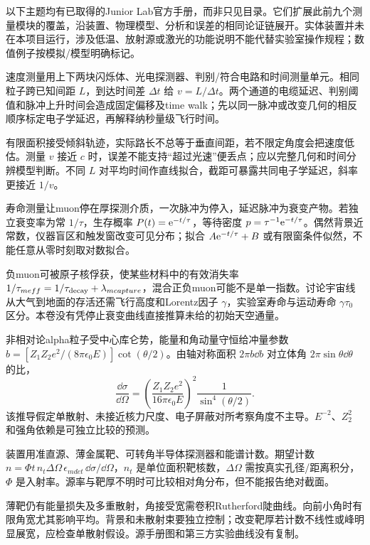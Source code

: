以下主题均有已取得的Junior Lab官方手册，而非只见目录。它们扩展此前九个测量模块的覆盖，沿装置、物理模型、分析和误差的相同论证链展开。实体装置并未在本项目运行，涉及低温、放射源或激光的功能说明不能代替实验室操作规程；数值例子按模拟/模型明确标记。

速度测量用上下两块闪烁体、光电探测器、判别/符合电路和时间测量单元。相同粒子跨已知间距 $L$，到达时间差 $\Delta t$ 给 $v=L/\Delta t$。两个通道的电缆延迟、判别阈值和脉冲上升时间会造成固定偏移及time walk；先以同一脉冲或改变几何的相反顺序标定电子学延迟，再解释纳秒量级飞行时间。

有限面积接受倾斜轨迹，实际路长不总等于垂直间距，若不限定角度会把速度低估。测量 $v$ 接近 $c$ 时，误差不能支持“超过光速”便丢点；应以完整几何和时间分辨模型判断。不同 $L$ 对平均时间作直线拟合，截距可暴露共同电子学延迟，斜率更接近 $1/v$。

寿命测量让muon停在厚探测介质，一次脉冲为停入，延迟脉冲为衰变产物。若独立衰变率为常 $1/\tau$，生存概率 $P(t)=\mathrm e^{-t/\tau}$，等待密度 $p=\tau^{-1}\mathrm e^{-t/\tau}$。偶然背景近常数，仪器盲区和触发窗改变可见分布；拟合 $A\mathrm e^{-t/\tau}+B$ 或有限窗条件似然，不能任意从零时刻取对数拟合。

负muon可被原子核俘获，使某些材料中的有效消失率 $1/\tau_{
m eff}=1/\tau_{\rm decay}+\lambda_{
m capture}$，混合正负muon可能不是单一指数。讨论宇宙线从大气到地面的存活还需飞行高度和Lorentz因子 $\gamma$，实验室寿命与运动寿命 $\gamma\tau_0$ 区分。本卷没有凭停止衰变曲线直接推算未给的初始天空通量。

非相对论alpha粒子受中心库仑势，能量和角动量守恒给冲量参数 $b=[Z_1Z_2e^2/(8\pi\epsilon_0E)]\cot(\theta/2)$。由轴对称面积 $2\pi b\dd b$ 对立体角 $2\pi\sin\theta\dd\theta$ 的比，
\[
\frac{\dd\sigma}{\dd\Omega}=\left(\frac{Z_1Z_2e^2}{16\pi\epsilon_0E}\right)^2\frac1{\sin^4(\theta/2)}.
\]
该推导假定单散射、未接近核力尺度、电子屏蔽对所考察角度不主导。$E^{-2}$、$Z_2^2$ 和强角依赖是可独立比较的预测。

装置用准直源、薄金属靶、可转角半导体探测器和能谱计数。期望计数 $n=\Phi t\,n_t\Delta\Omega\,\epsilon_{
m det}\,\dd\sigma/\dd\Omega$，$n_t$ 是单位面积靶核数，$\Delta\Omega$ 需按真实孔径/距离积分，$\Phi$ 是入射率。源率与靶厚不明时可比较相对角分布，但不能报告绝对截面。

薄靶仍有能量损失及多重散射，角接受宽需卷积Rutherford陡曲线。向前小角时有限角宽尤其影响平均。背景和未散射束要独立控制；改变靶厚若计数不线性或峰明显展宽，应检查单散射假设。源手册图和第三方实验曲线没有复制。


